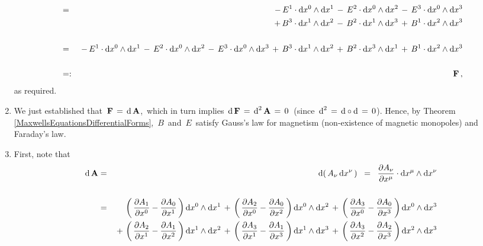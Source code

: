 \begin{enumerate}
\begin{eqnarray*}
	\\ \\
	& = &
		\,-\,
		E^{1} \cdot \textnormal{d} x^{0} \wedge \textnormal{d} x^{1}
		\,-\,
		E^{2} \cdot \textnormal{d} x^{0} \wedge \textnormal{d} x^{2}
		\,-\,
		E^{3} \cdot \textnormal{d} x^{0} \wedge \textnormal{d} x^{3}
	\\
	&&
		\,+\,
		B^{3} \cdot \textnormal{d} x^{1} \wedge \textnormal{d} x^{2}
		\,-\,
		B^{2} \cdot \textnormal{d} x^{1} \wedge \textnormal{d} x^{3}
		\,+\,
		B^{1} \cdot \textnormal{d} x^{2} \wedge \textnormal{d} x^{3}
	\\ \\
	& = &
		\,-\,
		E^{1} \cdot \textnormal{d} x^{0} \wedge \textnormal{d} x^{1}
		\,-\,
		E^{2} \cdot \textnormal{d} x^{0} \wedge \textnormal{d} x^{2}
		\,-\,
		E^{3} \cdot \textnormal{d} x^{0} \wedge \textnormal{d} x^{3}
		\,+\,
		B^{3} \cdot \textnormal{d} x^{1} \wedge \textnormal{d} x^{2}
		\,+\,
		B^{2} \cdot \textnormal{d} x^{3} \wedge \textnormal{d} x^{1}
		\,+\,
		B^{1} \cdot \textnormal{d} x^{2} \wedge \textnormal{d} x^{3}
	\\ \\
	& =: &
		\mathbf{F}\,,
	\end{eqnarray*}
	as required.
\item
	We just established that
	\,$\mathbf{F} \, = \, \textnormal{d}\,\mathbf{A}$,\,
	which in turn implies
	\,$\textnormal{d}\,\mathbf{F} \, = \, \textnormal{d}^{2}\,\mathbf{A} \, = \, 0$\,
	(since \,$\textnormal{d}^{2} \, = \, \textnormal{d} \circ \textnormal{d} \, = \, 0$).
	Hence, by Theorem \ref{MaxwellsEquationsDifferentialForms},
	\,$B$\, and \,$E$\, satisfy
	Gauss's law for magnetism (non-existence of magnetic monopoles) and Faraday's law.
\item
	First, note that
	\begin{eqnarray*}
	\d\,\mathbf{A}
	& = &
		\d\!\left(\,A_{\nu}\,\d x^{\nu}\,\right)
	\;\; = \;\;
		\dfrac{\partial A_{\nu}}{\partial x^{\mu}} \cdot \d x^{\mu} \wedge \d x^{\nu}
	\\ \\
	& = &
		\,{\color{white}+}\,
		\left(\,\dfrac{\partial A_{1}}{\partial x^{0}} - \dfrac{\partial A_{0}}{\partial x^{1}}\,\right)\d x^{0} \wedge \d x^{1}
		\,+\,
		\left(\,\dfrac{\partial A_{2}}{\partial x^{0}} - \dfrac{\partial A_{0}}{\partial x^{2}}\,\right)\d x^{0} \wedge \d x^{2}
		\,+\,
		\left(\,\dfrac{\partial A_{3}}{\partial x^{0}} - \dfrac{\partial A_{0}}{\partial x^{3}}\,\right)\d x^{0} \wedge \d x^{3}
	\\
	&&
		\,+\,
		\left(\,\dfrac{\partial A_{2}}{\partial x^{1}} - \dfrac{\partial A_{1}}{\partial x^{2}}\,\right)\d x^{1} \wedge \d x^{2}
		\,+\,
		\left(\,\dfrac{\partial A_{3}}{\partial x^{1}} - \dfrac{\partial A_{1}}{\partial x^{3}}\,\right)\d x^{1} \wedge \d x^{3}
		\,+\,
		\left(\,\dfrac{\partial A_{3}}{\partial x^{2}} - \dfrac{\partial A_{2}}{\partial x^{3}}\,\right)\d x^{2} \wedge \d x^{3}

\end{eqnarray*}
\end{enumerate}
